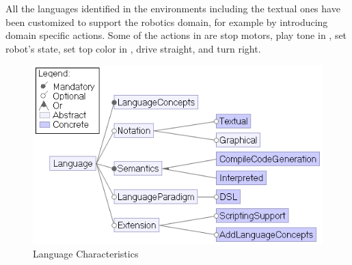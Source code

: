 All the languages identified in the environments including the textual ones have been customized to support the robotics domain, for example by introducing domain specific actions. Some of the actions in \lego are stop motors, play tone in \trik, set robot's state, set top color in \aseba,  drive straight, and turn right. %

\begin{figure}[t]
     \centering
    \includegraphics[width=.75\columnwidth]{Languagefeatures.png}
      \caption{Language Characteristics}
      \label{fig:languagefeatures}
   \end{figure}

